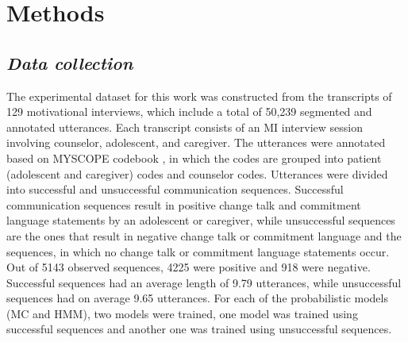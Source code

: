 \documentclass{amia_summit_2018}
\begin{document}
\section*{Methods}
\subsection*{\textit{Data collection}}
The experimental dataset for this work was constructed from the transcripts of 129 motivational interviews, which include a total of 50,239 segmented and annotated utterances. Each transcript consists
of an MI interview session involving counselor, adolescent, and caregiver. The utterances were annotated based on MYSCOPE codebook \cite{carcone2013provider}, in which the codes are grouped into
patient (adolescent and caregiver) codes and counselor codes. Utterances were divided into successful and unsuccessful communication sequences. Successful communication sequences result in
positive change talk and commitment language statements by an adolescent or caregiver, while unsuccessful sequences are the ones that result in negative change talk or commitment language and the
sequences, in which no change talk or commitment language statements occur. Out of 5143 observed sequences, 4225 were positive and 918 were negative. Successful sequences had an average length of
9.79 utterances, while unsuccessful sequences had on average 9.65 utterances. For each of the probabilistic models (MC and HMM), two models were trained, one model was trained using successful
sequences and another one was trained using unsuccessful sequences. 

%
\end{document}
